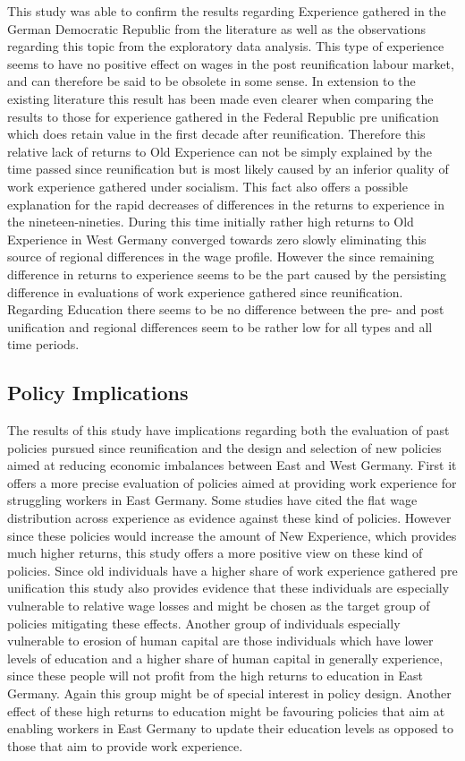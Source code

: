 	This study was able to confirm the results regarding Experience gathered in the German Democratic Republic from the literature as well as the observations regarding this topic from the exploratory data analysis. This type of experience seems to have no positive effect on wages in the post reunification labour market, and can therefore be said to be obsolete in some sense. In extension to the existing literature this result has been made even clearer when comparing the results to those for experience gathered in the Federal Republic pre unification which does retain value in the first decade after reunification. Therefore this relative lack of returns to Old Experience can not be simply explained by the time passed since reunification but is most likely caused by an inferior quality of work experience gathered under socialism. This fact also offers a possible  explanation for the rapid decreases of differences in the returns to experience in the nineteen-nineties. During this time initially rather high returns to Old Experience in West Germany converged towards zero slowly eliminating this source of regional differences in the wage profile. However the since remaining difference in returns to experience seems to be the part caused by the persisting  difference in evaluations of work experience gathered since reunification. Regarding Education there seems to be no difference between the pre- and post unification and regional differences seem to be rather low for all types and all time periods. 
\subsection{Policy Implications}
The results of this study have implications regarding both the evaluation of past policies pursued since reunification and the design and selection of new policies aimed at reducing economic imbalances between East and West Germany. First it offers a more precise evaluation of policies aimed at providing work experience for struggling workers in East Germany. Some studies have cited the flat wage distribution across experience as evidence against these kind of policies. However since these policies would increase the amount of New Experience, which provides much higher returns, this study offers a more positive view on these kind of policies. Since old individuals have a higher share of work experience gathered pre unification this study also provides evidence that these individuals are especially vulnerable to relative wage losses and might be chosen as the target group of policies mitigating these effects. Another group of individuals especially vulnerable to erosion of human capital are those individuals which have lower levels of education and a higher share of human capital in generally experience, since these people will not profit from the high returns to education in East Germany. Again this group might be of special interest in policy design. Another effect of these high returns to education might be favouring policies that aim at enabling workers in East Germany to update their education levels as opposed to those that aim to provide work experience.

